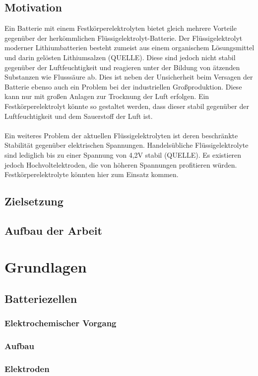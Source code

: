\documentclass[a4paper, 11pt, headsepline,footsepline,twoside,abstract]{scrbook}
\begin{document}
\section{Motivation}
Ein Batterie mit einem Festkörperelektrolyten bietet gleich mehrere Vorteile gegenüber der herkömmlichen Flüssigelektrolyt-Batterie. Der Flüssigelektrolyt moderner Lithiumbatterien besteht zumeist aus einem organischem Lösungsmittel und darin gelösten Lithiumsalzen (QUELLE). Diese sind jedoch nicht stabil gegenüber der Luftfeuchtigkeit und reagieren unter der Bildung von ätzenden Substanzen wie Flusssäure ab. Dies ist neben der Unsicherheit beim Versagen der Batterie ebenso auch ein Problem bei der industriellen Großproduktion. Diese kann nur mit großen Anlagen zur Trocknung der Luft erfolgen. Ein Festkörperelektrolyt könnte so gestaltet werden, dass dieser stabil gegenüber der Luftfeuchtigkeit und dem Sauerstoff der Luft ist.
\\\\
Ein weiteres Problem der aktuellen Flüssigelektrolyten ist deren beschränkte Stabilität gegenüber elektrischen Spannungen. Handelsübliche Flüssigelektrolyte sind lediglich bis zu einer Spannung von 4,2V stabil (QUELLE). Es existieren jedoch Hochvoltelektroden, die von höheren Spannungen profitieren würden. Festkörperelektrolyte könnten hier zum Einsatz kommen.
\section{Zielsetzung}
\section{Aufbau der Arbeit}
\chapter{Grundlagen}
\section{Batteriezellen}
\subsection{Elektrochemischer Vorgang}
\subsection{Aufbau}
\subsection{Elektroden}
\end{document}
